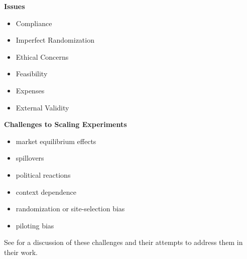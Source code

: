 \begin{frame}\textbf{Issues}\vspace{0.3cm}

\begin{itemize}\setlength\itemsep{0.5em}
\item Compliance
\item Imperfect Randomization
\item Ethical Concerns
\item Feasibility
\item Expenses
\item External Validity
\end{itemize}
\end{frame}
\begin{frame}\textbf{Challenges to Scaling Experiments}\vspace{0.3cm}

\begin{itemize}\setlength\itemsep{0.5em}
\item market equilibrium effects
\item spillovers
\item political reactions
\item context dependence
\item randomization or site-selection bias
\item piloting bias\vspace{0.3cm}
\end{itemize}

See \citet{Banerjee.2017} for a discussion of these challenges and their attempts to address them in their work.
\end{frame}
